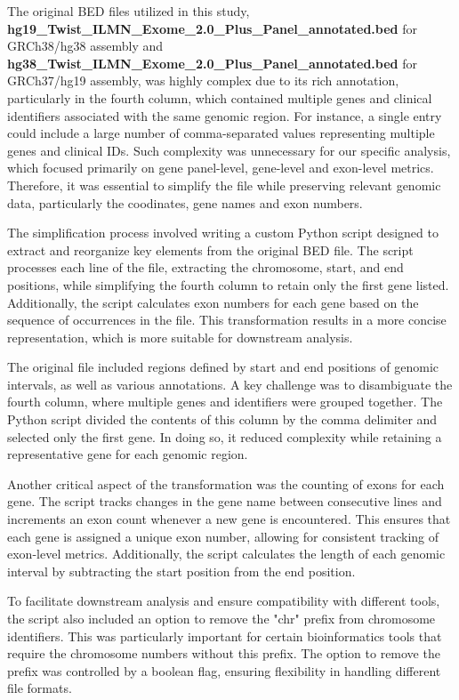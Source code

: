 The original BED files utilized in this study, \textbf{hg19\_Twist\_ILMN\_Exome\_2.0\_Plus\_Panel\_annotated.bed} for GRCh38/hg38 assembly and \textbf{hg38\_Twist\_ILMN\_Exome\_2.0\_Plus\_Panel\_annotated.bed} for GRCh37/hg19 assembly, was highly complex due to its rich annotation, particularly in the fourth column, which contained multiple genes and clinical identifiers associated with the same genomic region. For instance, a single entry could include a large number of comma-separated values representing multiple genes and clinical IDs. Such complexity was unnecessary for our specific analysis, which focused primarily on gene panel-level, gene-level and exon-level metrics. Therefore, it was essential to simplify the file while preserving relevant genomic data, particularly the coodinates, gene names and exon numbers.

The simplification process involved writing a custom Python script designed to extract and reorganize key elements from the original BED file. The script processes each line of the file, extracting the chromosome, start, and end positions, while simplifying the fourth column to retain only the first gene listed. Additionally, the script calculates exon numbers for each gene based on the sequence of occurrences in the file. This transformation results in a more concise representation, which is more suitable for downstream analysis.

The original file included regions defined by start and end positions of genomic intervals, as well as various annotations. A key challenge was to disambiguate the fourth column, where multiple genes and identifiers were grouped together. The Python script divided the contents of this column by the comma delimiter and selected only the first gene. In doing so, it reduced complexity while retaining a representative gene for each genomic region.

Another critical aspect of the transformation was the counting of exons for each gene. The script tracks changes in the gene name between consecutive lines and increments an exon count whenever a new gene is encountered. This ensures that each gene is assigned a unique exon number, allowing for consistent tracking of exon-level metrics. Additionally, the script calculates the length of each genomic interval by subtracting the start position from the end position.

To facilitate downstream analysis and ensure compatibility with different tools, the script also included an option to remove the "chr" prefix from chromosome identifiers. This was particularly important for certain bioinformatics tools that require the chromosome numbers without this prefix. The option to remove the prefix was controlled by a boolean flag, ensuring flexibility in handling different file formats.

